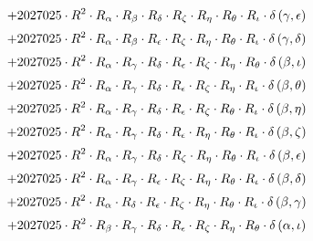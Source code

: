 \begin{subequations}
\begin{gather}
 \\[0.2em] \notag 		 + 2027025 \cdot R^{2} \cdot R_{\alpha{}} \cdot R_{\beta{}} \cdot R_{\delta{}} \cdot R_{\zeta{}} \cdot R_{\eta{}} \cdot R_{\theta{}} \cdot R_{\iota{}} \cdot \delta{}\left(\gamma{}, \epsilon{}\right) 
 \\[0.2em] \notag 		 + 2027025 \cdot R^{2} \cdot R_{\alpha{}} \cdot R_{\beta{}} \cdot R_{\epsilon{}} \cdot R_{\zeta{}} \cdot R_{\eta{}} \cdot R_{\theta{}} \cdot R_{\iota{}} \cdot \delta{}\left(\gamma{}, \delta{}\right) 
 \\[0.2em] \notag 		 + 2027025 \cdot R^{2} \cdot R_{\alpha{}} \cdot R_{\gamma{}} \cdot R_{\delta{}} \cdot R_{\epsilon{}} \cdot R_{\zeta{}} \cdot R_{\eta{}} \cdot R_{\theta{}} \cdot \delta{}\left(\beta{}, \iota{}\right) 
 \\[0.2em] \notag 		 + 2027025 \cdot R^{2} \cdot R_{\alpha{}} \cdot R_{\gamma{}} \cdot R_{\delta{}} \cdot R_{\epsilon{}} \cdot R_{\zeta{}} \cdot R_{\eta{}} \cdot R_{\iota{}} \cdot \delta{}\left(\beta{}, \theta{}\right) 
 \\[0.2em] \notag 		 + 2027025 \cdot R^{2} \cdot R_{\alpha{}} \cdot R_{\gamma{}} \cdot R_{\delta{}} \cdot R_{\epsilon{}} \cdot R_{\zeta{}} \cdot R_{\theta{}} \cdot R_{\iota{}} \cdot \delta{}\left(\beta{}, \eta{}\right) 
 \\[0.2em] \notag 		 + 2027025 \cdot R^{2} \cdot R_{\alpha{}} \cdot R_{\gamma{}} \cdot R_{\delta{}} \cdot R_{\epsilon{}} \cdot R_{\eta{}} \cdot R_{\theta{}} \cdot R_{\iota{}} \cdot \delta{}\left(\beta{}, \zeta{}\right) 
 \\[0.2em] \notag 		 + 2027025 \cdot R^{2} \cdot R_{\alpha{}} \cdot R_{\gamma{}} \cdot R_{\delta{}} \cdot R_{\zeta{}} \cdot R_{\eta{}} \cdot R_{\theta{}} \cdot R_{\iota{}} \cdot \delta{}\left(\beta{}, \epsilon{}\right) 
 \\[0.2em] \notag 		 + 2027025 \cdot R^{2} \cdot R_{\alpha{}} \cdot R_{\gamma{}} \cdot R_{\epsilon{}} \cdot R_{\zeta{}} \cdot R_{\eta{}} \cdot R_{\theta{}} \cdot R_{\iota{}} \cdot \delta{}\left(\beta{}, \delta{}\right) 
 \\[0.2em] \notag 		 + 2027025 \cdot R^{2} \cdot R_{\alpha{}} \cdot R_{\delta{}} \cdot R_{\epsilon{}} \cdot R_{\zeta{}} \cdot R_{\eta{}} \cdot R_{\theta{}} \cdot R_{\iota{}} \cdot \delta{}\left(\beta{}, \gamma{}\right) 
 \\[0.2em] \notag 		 + 2027025 \cdot R^{2} \cdot R_{\beta{}} \cdot R_{\gamma{}} \cdot R_{\delta{}} \cdot R_{\epsilon{}} \cdot R_{\zeta{}} \cdot R_{\eta{}} \cdot R_{\theta{}} \cdot \delta{}\left(\alpha{}, \iota{}\right) 

\end{gather}
\end{subequations}
